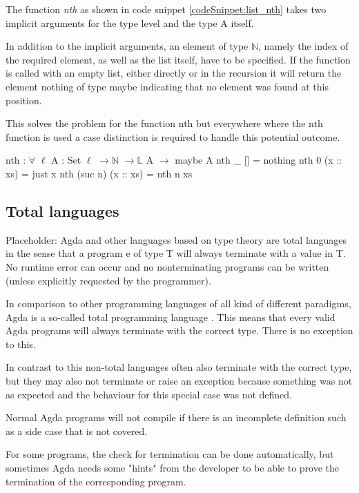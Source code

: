 The function \emph{nth} as shown in code snippet \ref{codeSnippet:list_nth} takes two implicit arguments for the type level and the type A itself.

In addition to the implicit arguments, an element of type $\mathbb{N}$, namely the index of the required element, as well as the list itself, have to be specified.
If the function is called with an empty list, either directly or in the recursion it will return the element nothing of type maybe indicating that no element was found at this position.

This solves the problem for the function nth but everywhere where the nth function is used a case distinction is required to handle this potential outcome.
\begin{codesnippet}[mathescape=true, caption={Definition of nth function in Agda}, label={codeSnippet:list_nth}]
nth : $\forall$ {$\ell$} {A : Set $\ell$} $\rightarrow \mathbb{N}$ $\rightarrow \mathbb{L}$ A $\rightarrow$ maybe A
nth _ [] = nothing
nth 0 (x :: xs) = just x
nth (suc n) (x :: xs) = nth n xs
\end{codesnippet}

\subsection{Total languages}\label{section:total_languages}
Placeholder: Agda and other languages based on type theory are total languages in the sense that a program e of type T will always terminate with a value in T. 
No runtime error can occur and no nonterminating programs can be written (unless explicitly requested by the programmer)\cite{AgdaReadTheDocs}.

In comparison to other programming languages of all kind of different paradigms, Agda is a so-called total programming language \cite{AgdaReadTheDocs}.
This means that every valid Agda programs will always terminate with the correct type. There is no exception to this.

In contrast to this non-total languages often also terminate with the correct type, but they may also not terminate or raise an exception because something was not as expected and the behaviour for this special case was not defined.

Normal Agda programs will not compile if there is an incomplete definition such as a side case that is not covered.

For some programs, the check for termination can be done automatically, but sometimes Agda needs some "hints" from the developer to be able to prove the termination of the corresponding program.

